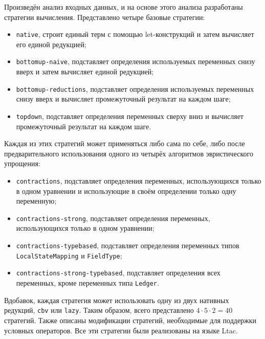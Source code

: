 \documentclass[../diploma.tex]{subfiles}
\begin{document}
Произведён анализ входных данных, и на основе этого анализа разработаны стратегии вычисления. Представлено четыре базовые стратегии:
\begin{itemize}
    \item \texttt{native}, строит единый терм с помощью let-конструкций и затем вычисляет его единой редукцией;
    \item \texttt{bottomup-naive}, подставляет определения используемых переменных снизу вверх и затем вычисляет единой редукцией;
    \item \texttt{bottomup-reductions}, подставляет определения используемых переменных снизу вверх и вычисляет промежуточный результат на каждом шаге;
    \item \texttt{topdown}, подставляет определения переменных сверху вниз и вычисляет промежуточный результат на каждом шаге.
\end{itemize}

Каждая из этих стратегий может применяться либо сама по себе, либо после предварительного использования одного из четырёх алгоритмов эвристического упрощения:
\begin{itemize}
    \item \texttt{contractions}, подставляет определения переменных, использующихся только в одном уравнении и использующие в своём определении только одну переменную;
    \item \texttt{contractions-strong}, подставляет определения переменных, использующихся только в одном уравнении;
    \item \texttt{contractions-typebased}, подставляет определения переменных типов\\\texttt{LocalStateMapping} и \texttt{FieldType};
    \item \texttt{contractions-strong-typebased}, подставляет определения всех переменных, кроме переменных типа \texttt{Ledger}.
\end{itemize}

Вдобавок, каждая стратегия может использовать одну из двух нативных редукций, \texttt{cbv} или \texttt{lazy}. Таким образом, всего представлено $4 \cdot 5 \cdot 2 = 40$ стратегий. Также описаны модификации стратегий, необходимые для поддержки условных операторов. Все эти стратегии были реализованы на языке Ltac.
\end{document}
